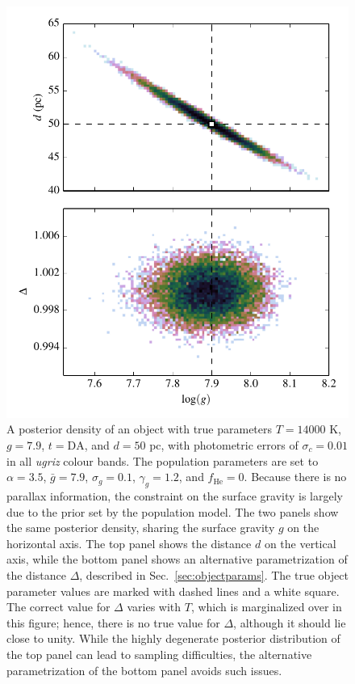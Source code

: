 \documentclass[fleqn,usenatbib]{mnras}
\newcommand{\Teff}{T}
\newcommand{\logg}{g}
\begin{document}
\begin{figure}
	\includegraphics[width=\columnwidth]{banana.pdf}
    \caption{A posterior density of an object with true parameters $\Teff=14000$ K, $\logg=7.9$, $t=\text{DA}$, and $d=50$ pc, with photometric errors of $\sigma_c=0.01$ in all \emph{ugriz} colour bands. The population parameters are set to $\alpha=3.5$, $\bar{g}=7.9$, $\sigma_g=0.1$, $\gamma_g=1.2$, and $f_\text{He}=0$. Because there is no parallax information, the constraint on the surface gravity is largely due to the prior set by the population model. The two panels show the same posterior density, sharing the surface gravity $\logg$ on the horizontal axis. The top panel shows the distance $d$ on the vertical axis, while the bottom panel shows an alternative parametrization of the distance $\Delta$, described in Sec.~\ref{sec:objectparams}. The true object parameter values are marked with dashed lines and a white square. The correct value for $\Delta$ varies with $\Teff$, which is marginalized over in this figure; hence, there is no true value for $\Delta$, although it should lie close to unity. While the highly degenerate posterior distribution of the top panel can lead to sampling difficulties, the alternative parametrization of the bottom panel avoids such issues.}
    \label{fig:banana}
\end{figure}
\end{document}
